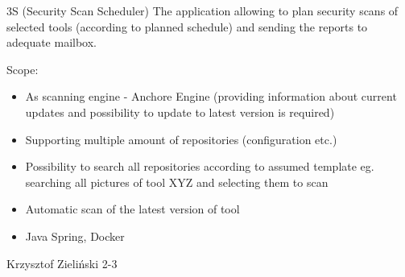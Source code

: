 \begin{project}
{3S (Security Scan Scheduler)}
{The application allowing to plan security scans of selected tools (according to planned schedule) and sending the reports to adequate mailbox.} 
{
Scope:
\begin{itemize}
	\item As scanning engine - Anchore Engine (providing information about current updates and possibility to update to latest version is required)
	\item Supporting multiple amount of repositories (configuration etc.)
	\item Possibility to search all repositories according to assumed template eg. searching all pictures of tool XYZ and selecting them to scan
	\item Automatic scan of the latest version of tool
\end{itemize}
}
{
\begin{itemize}
	\item Java Spring, Docker
\end{itemize}
}
{Krzysztof Zieliński}
{2-3}
\end{project}
